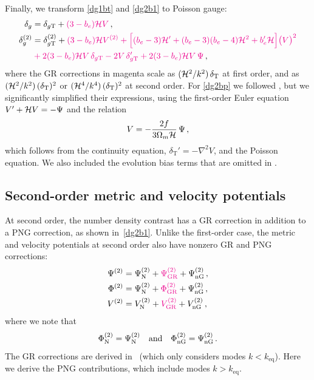 {{{Finally, we transform \eqref{dg1bt} and \eqref{dg2b1} to Poisson gauge: 
\begin{align}
\delta_{g}&= \delta_{g{\mathrm{T}}}  + {\color{magenta}{(3-b_e){\cal H} V}}\,,\label{dg1bp}
\\ \label{dg2bp}
\delta^{(2)}_{g} &= \delta^{(2)}_{g{\mathrm{T}}} +{\color{magenta}{(3-b_e){\cal H}V^{(2)} + \Big[ (b_e-3){\cal H}'+(b_e-3)(b_e-4){\cal H}^2 +b_e'{\cal H}\Big]\big( V\big)^2}}
\notag \\
&{\color{magenta}{{}+ 2(3-b_e){\cal H} V\,\delta_{g{\mathrm{T}}} - 2V\,\delta_{g{\mathrm{T}}}'
+2(3-b_e){\cal H} V\,\Psi}}\,,
\end{align}
{where the GR corrections in {magenta} scale as $(\mathcal{H}^2/k^2)\,\delta_{\mathrm{T}}$ at first order, and as $(\mathcal{H}^2/k^2)\,(\delta_{\mathrm{T}})^2$ or $(\mathcal{H}^4/k^4)\,(\delta_{\mathrm{T}})^2$ at second order.}
For \eqref{dg2bp} we followed \cite{Bertacca:2014wga,  Jolicoeur:2017nyt,deWeerd:2019cae}, but we significantly  simplified their expressions, using the first-order Euler equation $V'+{\cal H}V=- \Psi$ and the {relation 
\begin{equation}\label{vpsi}
 V = - \frac{2f}{3\Omega_m\mathcal{H}}\, \Psi\,, 
\end{equation}
which follows from the continuity equation, $\delta_{\mathrm{T}}'=-\nabla^2 V$, and the Poisson equation.}  We also included the evolution bias terms that are omitted in \cite{Umeh:2019jqg}.
%
\subsection{{Second-order metric and velocity potentials}} \label{ss-mvp}
%
{At second order,  the number density contrast has a GR correction in addition to a PNG correction, as shown in~\eqref{dg2b1}.
 Unlike the  first-order case, the metric and velocity potentials at second order also have nonzero GR and PNG corrections:
\begin{align}
\Psi^{(2)} &= \Psi^{(2)}_{{\mathrm{N}}}+{\color{magenta}{\Psi^{(2)}_{{\mathrm{GR}}}}}+ \Psi^{(2)}_{{\mathrm{nG}}}\,, \\
\Phi^{(2)} &= \Psi^{(2)}_{{\mathrm{N}}}+{\color{magenta}{\Phi^{(2)}_{{\mathrm{GR}}}}}+ \Psi^{(2)}_{{\mathrm{nG}}}\,, \\
V^{(2)} &= V^{(2)}_{{\mathrm{N}}}+{\color{magenta}{V^{(2)}_{{\mathrm{GR}}}}}+ V^{(2)}_{{\mathrm{nG}}}\,,
\end{align}
where we note that 
\begin{equation} \label{potnng}
\Phi^{(2)}_{{\mathrm{N}}}=\Psi^{(2)}_{{\mathrm{N}}} \quad \mbox{and} \quad \Phi^{(2)}_{{\mathrm{nG}}}=\Psi^{(2)}_{{\mathrm{nG}}}\,.
\end{equation}
 The GR corrections are derived in~\citep{Villa:2015ppa} (which only considers modes $k<k_{\mathrm{eq}}$). Here we derive the PNG contributions, which include modes $k > k_{\mathrm{eq}}$.

}}}}
